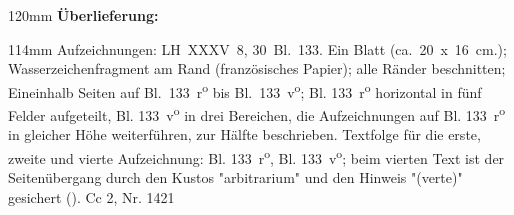 
\begin{ledgroupsized}[r]{120mm}
\footnotesize
\pstart
\noindent\textbf{Überlieferung:}
\pend
\end{ledgroupsized}
\begin{ledgroupsized}[r]{114mm}
\footnotesize
\pstart
\parindent -6mm
%
Aufzeichnungen:
LH~XXXV~8, 30~Bl.~133. 
Ein Blatt (ca.~20~x~16~cm.);
{Wasserzeichenfragment} am Rand (französisches Papier);
alle Ränder beschnitten; 
Eineinhalb Seiten auf Bl.~133~r\textsuperscript{o} bis Bl.~133~v\textsuperscript{o};
Bl. 133~r\textsuperscript{o} horizontal in fünf Felder aufgeteilt,
Bl. 133~v\textsuperscript{o} in drei Bereichen, die Aufzeichnungen auf Bl. 133~r\textsuperscript{o} in gleicher Höhe weiterführen, zur Hälfte beschrieben.
Textfolge für die erste, zweite und vierte Aufzeichnung: Bl. 133~r\textsuperscript{o}, Bl. 133~v\textsuperscript{o}; beim vierten Text ist der Seitenübergang durch den Kustos "arbitrarium" und den Hinweis "(verte)" gesichert ().
\pend
\pstart
\noindent
Cc 2, Nr. 1421
\pend
\end{ledgroupsized}
\vspace{5mm}
